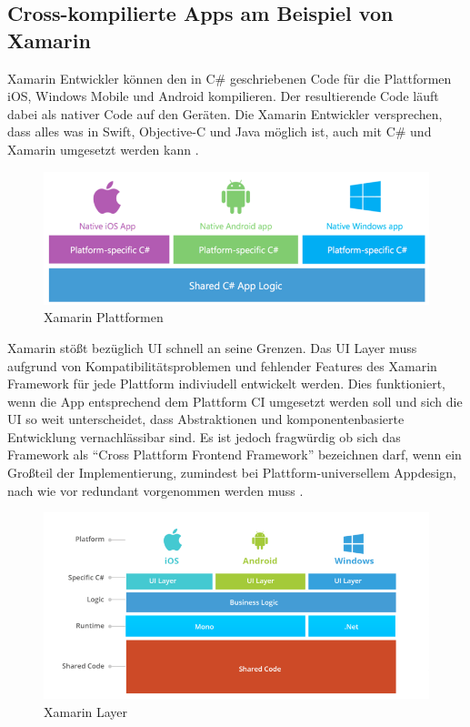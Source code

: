 \subsection{Cross-kompilierte Apps am Beispiel von Xamarin}

Xamarin Entwickler können den in C\# geschriebenen Code für die Plattformen iOS, Windows Mobile und Android kompilieren.
Der resultierende Code läuft dabei als nativer Code auf den Geräten.
Die Xamarin Entwickler versprechen, dass alles was in Swift, Objective-C und
Java möglich ist, auch mit C\# und Xamarin umgesetzt werden kann \cite{projectxamarin}.

\begin{figure}[ht]
 \centering
 \includegraphics[width=0.9\linewidth]{kapitel2/csharp_xamarin.png}
 \caption{Xamarin Plattformen \cite{7Reas20:online}}
\end{figure}
\vspace{1cm}

Xamarin stößt bezüglich \ac{UI} schnell an seine Grenzen. Das \ac{UI} Layer muss aufgrund von Kompatibilitätsproblemen und fehlender Features des Xamarin Framework
für jede Plattform indiviudell entwickelt werden. Dies funktioniert, wenn die App entsprechend dem Plattform CI umgesetzt werden soll und sich die \ac{UI} so weit unterscheidet,
dass Abstraktionen und komponentenbasierte Entwicklung vernachlässibar sind. Es ist jedoch fragwürdig ob sich das Framework als ``Cross Plattform Frontend Framework'' bezeichnen darf,
wenn ein Großteil der Implementierung, zumindest bei Plattform-universellem Appdesign, nach wie vor redundant vorgenommen werden muss \cite{7Reas20:online}.

\begin{figure}[ht]
 \centering
 \includegraphics[width=0.8\linewidth]{kapitel2/xamarin_ui_blocker.png}
 \caption{Xamarin Layer \cite{7Reas20:online}}
\end{figure}

